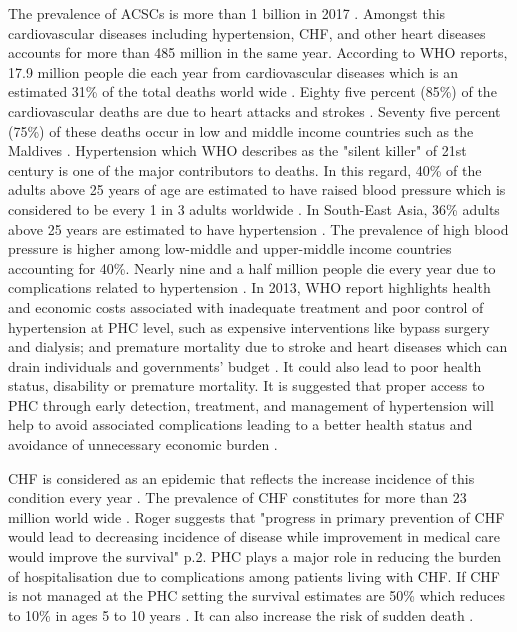 The prevalence of ACSCs is more than 1 billion in 2017 \cite{GHD:health:2017}. Amongst this cardiovascular diseases including hypertension, CHF, and other heart diseases accounts for more than 485 million in the same year. According to WHO reports, 17.9 million people die each year from cardiovascular diseases which is an estimated 31\% of the total deaths world wide \cite{WHO:health:2018}. Eighty five percent (85\%) of the cardiovascular deaths are due to heart attacks and strokes \cite{WHO:health:2018}. Seventy five percent (75\%) of these deaths occur in low and middle income countries such as the Maldives \cite{WHO:health:2018}. 
Hypertension which WHO describes as the "silent killer" of 21st century is one of the major contributors to deaths. In this regard, 40\% of the adults above 25 years of age are estimated to have raised blood pressure which is considered to be every 1 in 3 adults worldwide \cite{WHO:health:2018}. In South-East Asia, 36\% adults above 25 years are estimated to have hypertension \cite{WHO:health:2018}. The prevalence of high blood pressure is higher among low-middle and upper-middle income countries accounting for 40\%. Nearly nine and a half million people die every year due to complications related to hypertension \cite{WHO:health:2013}. In 2013, WHO report highlights health and economic costs associated with inadequate treatment and poor control of hypertension at PHC level, such as expensive interventions like bypass surgery and dialysis; and premature mortality due to stroke and heart diseases which can drain individuals and governments' budget \cite{WHO:health:2013}. It could also lead to poor health status, disability or premature mortality. It is suggested that proper access to PHC through early detection, treatment, and management of hypertension will help to avoid associated complications leading to a better health status and avoidance of unnecessary economic burden \cite{WHO:health:2013}.  

CHF is considered as an epidemic that reflects the increase incidence of this condition every year \cite{roger2013epidemiology}. The prevalence of CHF constitutes for more than 23 million world wide \cite{roger2013epidemiology}. Roger suggests that "progress in primary prevention of CHF would lead to decreasing incidence of disease while improvement in medical care would improve the survival" \cite{roger2013epidemiology} p.2. PHC plays a major role in reducing the burden of hospitalisation due to complications among patients living with CHF. If CHF is not managed at the PHC setting the survival estimates are 50\% which reduces to 10\% in ages 5 to 10 years \cite{chugh2008epidemiology,cowie2000survival}. It can also increase the risk of sudden death \cite{chugh2008epidemiology}.

